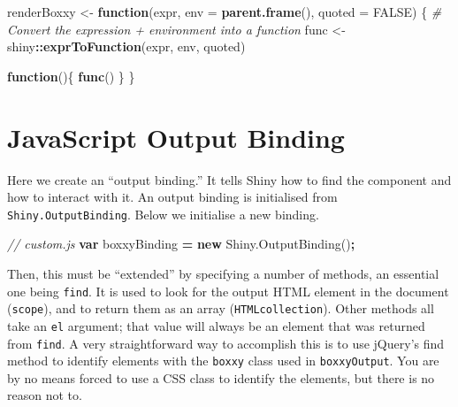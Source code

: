 \documentclass[10pt,]{krantz}
\makeatletter
\newenvironment{Shaded}{\begin{snugshade}}{\end{snugshade}}
\newcommand{\AttributeTok}[1]{\textcolor[rgb]{0.61,0.61,0.61}{#1}}
\newcommand{\CommentTok}[1]{\textcolor[rgb]{0.37,0.37,0.37}{\textit{#1}}}
\newcommand{\ControlFlowTok}[1]{\textcolor[rgb]{0.27,0.27,0.27}{\textbf{#1}}}
\newcommand{\DataTypeTok}[1]{\textcolor[rgb]{0.27,0.27,0.27}{#1}}
\newcommand{\KeywordTok}[1]{\textcolor[rgb]{0.27,0.27,0.27}{\textbf{#1}}}
\newcommand{\NormalTok}[1]{#1}
\newcommand{\OperatorTok}[1]{\textcolor[rgb]{0.43,0.43,0.43}{\textbf{#1}}}
\newcommand{\OtherTok}[1]{\textcolor[rgb]{0.37,0.37,0.37}{#1}}
\newcommand{\StringTok}[1]{\textcolor[rgb]{0.5,0.5,0.5}{#1}}
\newcommand{\VariableTok}[1]{\textcolor[rgb]{0,0,0}{#1}}
\newenvironment{kframe}{%
\medskip{}
\setlength{\fboxsep}{.8em}
 \def\at@end@of@kframe{}%
 \ifinner\ifhmode%
  \def\at@end@of@kframe{\end{minipage}}%
  \begin{minipage}{\columnwidth}%
 \fi\fi%
 \def\FrameCommand##1{\hskip\@totalleftmargin \hskip-\fboxsep
 \colorbox{shadecolor}{##1}\hskip-\fboxsep
     \hskip-\linewidth \hskip-\@totalleftmargin \hskip\columnwidth}%
 \MakeFramed {\advance\hsize-\width
   \@totalleftmargin\z@ \linewidth\hsize
   \@setminipage}}%
 {\par\unskip\endMakeFramed%
 \at@end@of@kframe}
\renewenvironment{Shaded}{\begin{kframe}}{\end{kframe}}
\makeatother
\begin{document}
\begin{Shaded}
\begin{Highlighting}[]
\NormalTok{renderBoxxy <-}\StringTok{ }\ControlFlowTok{function}\NormalTok{(expr, }\DataTypeTok{env =} \KeywordTok{parent.frame}\NormalTok{(), }
  \DataTypeTok{quoted =} \OtherTok{FALSE}\NormalTok{) \{}
  \CommentTok{# Convert the expression + environment into a function}
\NormalTok{  func <-}\StringTok{ }\NormalTok{shiny}\OperatorTok{::}\KeywordTok{exprToFunction}\NormalTok{(expr, env, quoted)}

  \ControlFlowTok{function}\NormalTok{()\{}
    \KeywordTok{func}\NormalTok{()}
\NormalTok{  \}}
\NormalTok{\}}
\end{Highlighting}
\end{Shaded}

\hypertarget{shiny-output-binding}{%
\section{JavaScript Output Binding}\label{shiny-output-binding}}

Here we create an ``output binding.'' It tells Shiny how to find the component and how to interact with it. An output binding is initialised from \texttt{Shiny.OutputBinding}. Below we initialise a new binding.

\begin{Shaded}
\begin{Highlighting}[]
\CommentTok{// custom.js}
\KeywordTok{var}\NormalTok{ boxxyBinding }\OperatorTok{=} \KeywordTok{new} \VariableTok{Shiny}\NormalTok{.}\AttributeTok{OutputBinding}\NormalTok{()}\OperatorTok{;}
\end{Highlighting}
\end{Shaded}

Then, this must be ``extended'' by specifying a number of methods, an essential one being \texttt{find}. It is used to look for the output HTML element in the document (\texttt{scope}), and to return them as an array (\texttt{HTMLcollection}). Other methods all take an \texttt{el} argument; that value will always be an element that was returned from \texttt{find}. A very straightforward way to accomplish this is to use jQuery's find method to identify elements with the \texttt{boxxy} class used in \texttt{boxxyOutput}. You are by no means forced to use a CSS class to identify the elements, but there is no reason not to.
\end{document}
